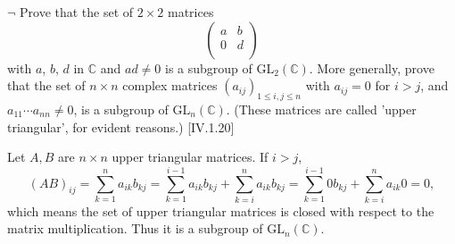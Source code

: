 \documentclass[12pt,letterpaper,boxed]{hmcpset}
\newcommand{\GL}{\mathrm{GL}}
\newcommand{\C}{\mathbb{C}}
\begin{document}
\begin{problem}[6.2]
$\neg$ Prove that the set of $2\times2$ matrices
\[
\begin{pmatrix}
	a& b\\
	0& d\\
\end{pmatrix}
\]
with $a$, $b$, $d$ in $\C$ and $ad\ne 0$ is a subgroup of $\GL_2(\C)$. More generally, prove that the set of $n\times n$ complex matrices $(a_{ij})_{1\le i,j\le n}$ with $a_{ij} = 0$ for $i>j$, and $a_{11}\cdots a_{nn}\ne 0$, is a subgroup of $\GL_n(\C)$. (These matrices are called 'upper triangular', for evident reasons.) [IV.1.20]
\end{problem}
\begin{solution}
Let $A, B$ are $n\times n$ upper triangular matrices. If $i>j$,
\[
(AB)_{ij}=\sum_{k=1}^{n}a_{ik}b_{kj}=\sum_{k=1}^{i-1}a_{ik}b_{kj}+\sum_{k=i}^{n}a_{ik}b_{kj}=\sum_{k=1}^{i-1}0b_{kj}+\sum_{k=i}^{n}a_{ik}0=0,
\]
which means the set of upper triangular matrices is closed with respect to the matrix multiplication. Thus it is a subgroup of $\GL_n(\C)$.
\end{solution}
\end{document}
